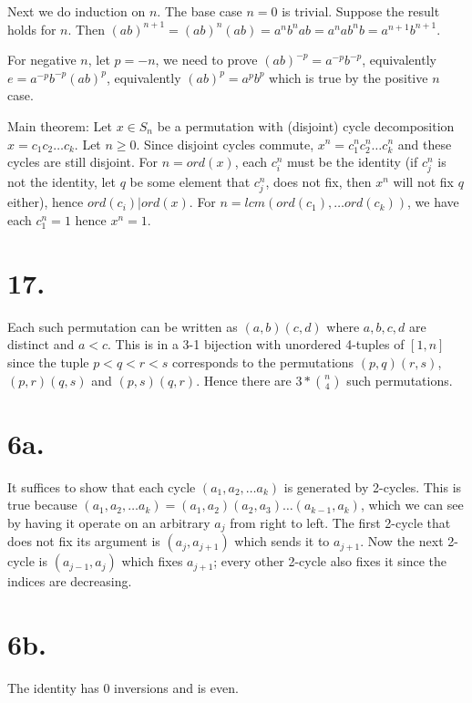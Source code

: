 \documentclass{article}
\begin{document}
Next we do induction on $n$. The base case $n=0$ is trivial. Suppose the result holds for $n$. Then $(ab)^{n+1} = (ab)^n(ab) = a^nb^na b = a^n a b^n b = a^{n+1}b^{n+1}$.

For negative $n$, let $p = -n$, we need to prove $(ab)^{-p} = a^{-p}b^{-p}$, equivalently $e = a^{-p}b^{-p} (ab)^p$, equivalently $(ab)^p = a^pb^p$ which is true by the positive $n$ case.

Main theorem: Let $x \in S_n$ be a permutation with (disjoint) cycle decomposition $x = c_1c_2\ldots c_k$. Let $n \ge 0$. Since disjoint cycles commute, $x^n = c_1^n c_2^n \ldots c_k^n$ and these cycles are still disjoint. For $n = ord(x)$, each $c_i^n$ must be the identity (if $c_j^n$ is not the identity, let $q$ be some element that $c_j^n$, does not fix, then $x^n$ will not fix $q$ either), hence $ord(c_i) | ord(x)$. For $n = lcm(ord(c_1), \ldots ord(c_k))$, we have each $c_1^n = 1$ hence $x^n = 1$.

\section*{17.}

Each such permutation can be written as $(a, b)(c, d)$ where $a, b, c, d$ are distinct and $a < c$. This is in a 3-1 bijection with unordered 4-tuples of $[1, n]$ since the tuple $p < q < r < s$ corresponds to the permutations $(p, q)(r, s)$, $(p, r)(q, s)$ and $(p, s)(q, r)$. Hence there are $3*\binom{n}{4}$ such permutations.

\section*{6a.}

It suffices to show that each cycle $(a_1, a_2, \ldots a_k)$ is generated by 2-cycles. This is true because $(a_1, a_2, \ldots a_k) = (a_1, a_2)(a_2, a_3)\ldots(a_{k-1}, a_k)$, which we can see by having it operate on an arbitrary $a_j$ from right to left. The first 2-cycle that does not fix its argument is $(a_j, a_{j+1})$ which sends it to $a_{j+1}$. Now the next 2-cycle is $(a_{j-1}, a_j)$ which fixes $a_{j+1}$; every other 2-cycle also fixes it since the indices are decreasing.

\section*{6b.}

The identity has 0 inversions and is even.
\end{document}
